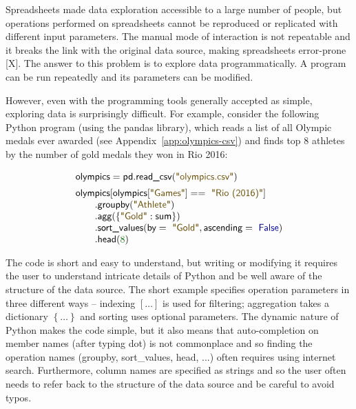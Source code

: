\documentclass[a4paper,UKenglish]{lipics-v2016}
\theoremstyle{plain}
\theoremstyle{definition}
\newcommand{\num}[1]{\textcolor{numclr}{#1}}
\newcommand{\str}[1]{\textnormal{\textcolor{strclr}{\sffamily "#1"}}}
\newcommand{\kvd}[1]{\textnormal{\textcolor{kvdclr}{\sffamily #1}}}
\newcommand{\ident}[1]{\textnormal{\sffamily #1}}
\begin{document}
Spreadsheets made data exploration accessible to a large number of people, but operations 
performed on spreadsheets cannot be reproduced or replicated with different input parameters.
The manual mode of interaction is not repeatable and it breaks the link with the original data 
source, making spreadsheets error-prone [X]. The answer to this problem is to explore data 
programmatically. A program can be run repeatedly and its parameters can be modified.

However, even with the programming tools generally accepted as simple, exploring data is 
surprisingly difficult. For example, consider the following Python program (using the pandas
library), which reads a list of all Olympic medals ever awarded (see Appendix~\ref{app:olympics-csv}) 
and finds top 8 athletes by the number of gold medals they won in Rio 2016:

\noindent
\begin{equation*}
\begin{array}{l}
\ident{olympics} = \ident{pd.read\_csv}(\str{olympics.csv})\\[0.5em]
\ident{olympics}[\ident{olympics}[\str{Games}]==\str{Rio (2016)}]\\
\qquad .\ident{groupby}(\str{Athlete})\\
\qquad .\ident{agg}(\left\{\str{Gold}:\ident{sum}\right\})\\
\qquad .\ident{sort\_values}(\ident{by}=\str{Gold}, \ident{ascending}=\kvd{False})\\
\qquad .\ident{head}(\num{8})
\end{array}
\end{equation*}

\noindent
The code is short and easy to understand, but writing or modifying it requires the user to 
understand intricate details of Python and be well aware of the structure of the data source. 
The short example specifies operation parameters in three different ways -- indexing $[\ldots]$ 
is used for filtering; aggregation takes a dictionary $\left\{\ldots\right\}$ and sorting uses 
optional parameters. The dynamic nature of Python makes the code simple, but it also means that
auto-completion on member names (after typing dot) is not commonplace and so finding the operation
names (\ident{groupby}, \ident{sort\_values}, \ident{head}, ...) often requires using internet 
search. Furthermore, column names are specified as strings and so the user often needs to refer back
to the structure of the data source and be careful to avoid typos.
\end{document}
